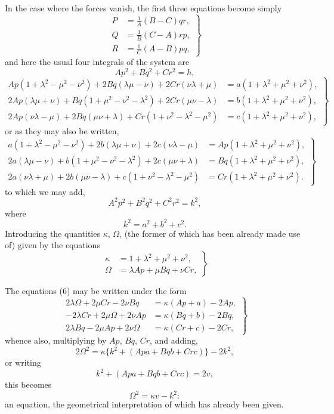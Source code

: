 \documentclass[11pt]{article}
\begin{document}
In the case where the forces vanish, the first three equations become simply
\[
\left.
\begin{aligned}
P&=\frac{1}{A}(B-C)qr,\\
Q&=\frac{1}{B}(C-A)rp,\\
R&=\frac{1}{C}(A-B)pq,
\end{aligned}
\right\}\tag{4}
\]
and here the usual four integrals of the system are
\[
Ap^2+Bq^2+Cr^2=h,\tag{5}
\]
\[
\left.
\begin{aligned}
Ap(1+\lambda^2-\mu^2-\nu^2)+2Bq(\lambda\mu-\nu)+2Cr(\nu\lambda+\mu)
 &=a(1+\lambda^2+\mu^2+\nu^2),\\
2Ap(\lambda\mu+\nu)+Bq(1+\mu^2-\nu^2-\lambda^2)+2Cr(\mu\nu-\lambda)
 &=b(1+\lambda^2+\mu^2+\nu^2),\\
2Ap(\nu\lambda-\mu)+2Bq(\mu\nu+\lambda)+Cr(1+\nu^2-\lambda^2-\mu^2)
 &=c(1+\lambda^2+\mu^2+\nu^2),
\end{aligned}
\right\}\tag{6}
\]
or as they may also be written,
\[
\left.
\begin{aligned}
a(1+\lambda^2-\mu^2-\nu^2)+2b(\lambda\mu+\nu)+2c(\nu\lambda-\mu)
 &=Ap(1+\lambda^2+\mu^2+\nu^2),\\
2a(\lambda\mu-\nu)+b(1+\mu^2-\nu^2-\lambda^2)+2c(\mu\nu+\lambda)
 &=Bq(1+\lambda^2+\mu^2+\nu^2),\\
2a(\nu\lambda+\mu)+2b(\mu\nu-\lambda)+c(1+\nu^2-\lambda^2-\mu^2)
 &=Cr(1+\lambda^2+\mu^2+\nu^2).
\end{aligned}
\right\}\tag{6 bis}
\]
to which we may add,
\[
A^2p^2+B^2q^2+C^2r^2=k^2,\tag{7}
\]
where
\[
k^2=a^2+b^2+c^2.\tag{8}
\]
Introducing the quantities $\kappa$, $\Omega$, (the former of which has been already
made use of) given by the equations
\[
\left.
\begin{aligned}
\kappa&=1+\lambda^2+\mu^2+\nu^2,\\
\Omega&=\lambda Ap+\mu Bq+\nu Cr,
\end{aligned}
\right\}\tag{9}
\]

\newpage
\setcounter{page}{240}

The equations (6) may be written under the form
\[
\left.
\begin{aligned}
2\lambda\Omega+2\mu Cr-2\nu Bq&=\kappa(Ap+a)-2Ap,\\
-2\lambda Cr+2\mu\Omega+2\nu Ap&=\kappa(Bq+b)-2Bq,\\
2\lambda Bq-2\mu Ap+2\nu\Omega&=\kappa(Cr+c)-2Cr,
\end{aligned}
\right\}\tag{10}
\]
whence also, multiplying by $Ap$, $Bq$, $Cr$, and adding,
\[
2\Omega^2=\kappa\{k^2+(Apa+Bqb+Crc)\}-2k^2,\tag{11}
\]
or writing
\[
k^2+(Apa+Bqb+Crc)=2v,\tag{12}
\]
this becomes
\[
\Omega^2=\kappa v-k^2:\tag{13}
\]
an equation, the geometrical interpretation of which has already been given.
\end{document}
